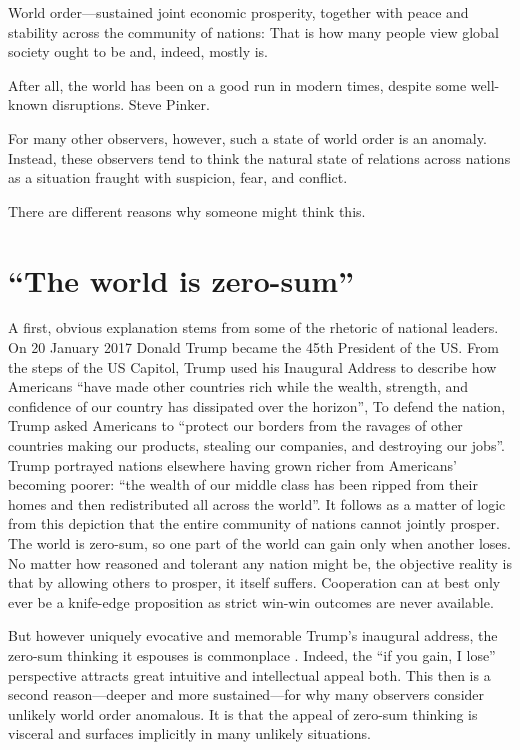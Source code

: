 %
%

{World order}---sustained joint economic prosperity,
together with peace and stability across the community of
nations: That is how many people view
global society ought to be and, indeed, mostly is.

After all, the world has been on a good run in modern times, despite
some well-known disruptions. Steve Pinker.

For many other observers, however, such a state of world order is an anomaly.
Instead, these observers tend to think the natural state of relations
across nations
as a situation fraught with suspicion, fear, and conflict.

There are different reasons why someone might think this.

\section{``The world is zero-sum''}

A first, obvious explanation stems from some of the rhetoric of
national leaders.
On 20 January 2017 Donald Trump became the 45th President of the US.
From the steps of the US Capitol, Trump
used his Inaugural Address to describe how Americans
``have made other countries rich while the wealth, strength,
and confidence of our country has dissipated over the horizon'',
To defend the nation, Trump asked Americans to
``protect our borders from the ravages of other
countries making our products, stealing our companies,
and destroying our jobs''.
Trump portrayed nations elsewhere having grown richer
from Americans' becoming poorer:
``the wealth of our middle class has been
ripped from their homes and then redistributed all across the world''.
It follows as a matter of logic from this depiction
that the entire community of nations cannot jointly prosper.
The world is zero-sum, so one part of the world
can gain only when another loses.
No matter how reasoned and tolerant any nation might be,
the objective reality is that by allowing others to prosper,
it itself suffers.
Cooperation can at best only ever be a knife-edge proposition as
strict win-win outcomes are never available.

But however uniquely evocative and memorable Trump's
inaugural address,
the zero-sum thinking it espouses is commonplace
\citep{Rachman-G-2011-Zero-Sum-Future}.
Indeed, the ``if you gain, I lose'' perspective attracts great
intuitive and intellectual appeal both.
This then is a second reason---deeper and more sustained---for
why many observers consider unlikely world order anomalous.
It is that the appeal of zero-sum thinking is visceral and
surfaces implicitly in many unlikely situations.

